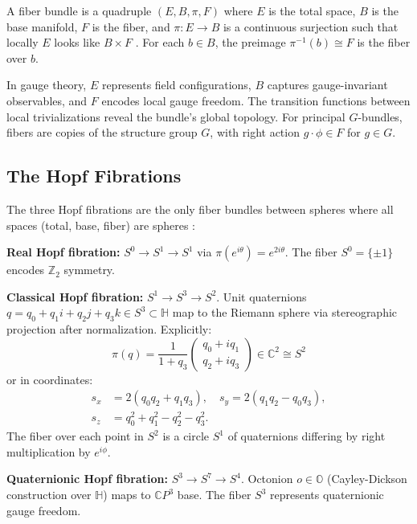 \documentclass[10pt,twocolumn]{article}
\newcommand{\CC}{\mathbb{C}}
\newcommand{\HH}{\mathbb{H}}
\newcommand{\OO}{\mathbb{O}}
\begin{document}
A fiber bundle is a quadruple $(E, B, \pi, F)$ where $E$ is the total space, $B$ is the base manifold, $F$ is the fiber, and $\pi: E \to B$ is a continuous surjection such that locally $E$ looks like $B \times F$ \citep{steenrod1951topology,nakahara2003geometry}. For each $b \in B$, the preimage $\pi^{-1}(b) \cong F$ is the fiber over $b$.

In gauge theory, $E$ represents field configurations, $B$ captures gauge-invariant observables, and $F$ encodes local gauge freedom. The transition functions between local trivializations reveal the bundle's global topology. For principal $G$-bundles, fibers are copies of the structure group $G$, with right action $g \cdot \phi \in F$ for $g \in G$.

\subsection{The Hopf Fibrations}

The three Hopf fibrations are the only fiber bundles between spheres where all spaces (total, base, fiber) are spheres \citep{hopf1931abbildungen,adams1960hopf}:

\textbf{Real Hopf fibration:} $S^0 \to S^1 \to S^1$ via $\pi(e^{i\theta}) = e^{2i\theta}$. The fiber $S^0 = \{\pm 1\}$ encodes $\mathbb{Z}_2$ symmetry.

\textbf{Classical Hopf fibration:} $S^1 \to S^3 \to S^2$. Unit quaternions $q = q_0 + q_1 i + q_2 j + q_3 k \in S^3 \subset \HH$ map to the Riemann sphere via stereographic projection after normalization. Explicitly:
\begin{equation}
\pi(q) = \frac{1}{1+q_3}\begin{pmatrix} q_0 + iq_1 \\ q_2 + iq_3 \end{pmatrix} \in \CC^2 \cong S^2
\end{equation}
or in coordinates:
\begin{align}
s_x &= 2(q_0 q_2 + q_1 q_3), \quad s_y = 2(q_1 q_2 - q_0 q_3), \\
s_z &= q_0^2 + q_1^2 - q_2^2 - q_3^2.
\end{align}
The fiber over each point in $S^2$ is a circle $S^1$ of quaternions differing by right multiplication by $e^{i\phi}$.

\textbf{Quaternionic Hopf fibration:} $S^3 \to S^7 \to S^4$. Octonion $o \in \OO$ (Cayley-Dickson construction over $\HH$) maps to $\CC P^3$ base. The fiber $S^3$ represents quaternionic gauge freedom.
\end{document}
